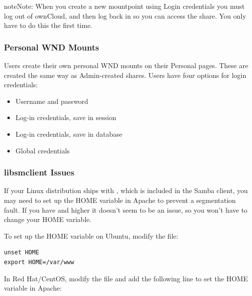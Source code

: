 \documentclass[letterpaper,10pt,english]{sphinxmanual}
\begin{document}
\begin{notice}{note}{Note:}
When you create a new mountpoint using Login credentials you must log
out of ownCloud, and then log back in so you can access the share. You
only have to do this the first time.
\end{notice}


\subsubsection{Personal WND Mounts}
\label{enterprise_external_storage/windows-network-drive_configuration:personal-wnd-mounts}
Users create their own personal WND mounts on their Personal pages. These are
created the same way as Admin-created shares. Users have four options for
login credentials:
\begin{itemize}
\item {} 
Username and password

\item {} 
Log-in credentials, save in session

\item {} 
Log-in credentials, save in database

\item {} 
Global credentials

\end{itemize}


\subsubsection{libsmclient Issues}
\label{enterprise_external_storage/windows-network-drive_configuration:libsmclient-issues}
If your Linux distribution ships with , which is included in
the Samba client, you may need to set up the HOME variable in Apache to prevent
a segmentation fault. If you have  and higher it doesn't
seem to be an issue, so you won't have to change your HOME variable.

To set up the HOME variable on Ubuntu, modify the 
file:

\begin{Verbatim}[commandchars=\\\{\}]
unset HOME
export HOME=/var/www
\end{Verbatim}

In Red Hat/CentOS, modify the  file and add the
following line to set the HOME variable in Apache:
\end{document}
